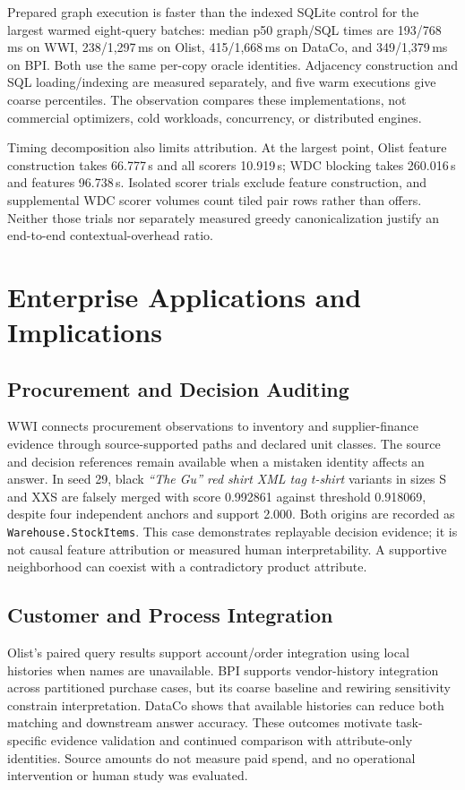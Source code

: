 \documentclass[conference,letterpaper]{IEEEtran}
\begin{document}
Prepared graph execution is faster than the indexed SQLite control for the largest warmed eight-query batches: median p50 graph/SQL times are 193/768\,ms on WWI, 238/1,297\,ms on Olist, 415/1,668\,ms on DataCo, and 349/1,379\,ms on BPI. Both use the same per-copy oracle identities. Adjacency construction and SQL loading/indexing are measured separately, and five warm executions give coarse percentiles. The observation compares these implementations, not commercial optimizers, cold workloads, concurrency, or distributed engines.

Timing decomposition also limits attribution. At the largest point, Olist feature construction takes 66.777\,s and all scorers 10.919\,s; WDC blocking takes 260.016\,s and features 96.738\,s. Isolated scorer trials exclude feature construction, and supplemental WDC scorer volumes count tiled pair rows rather than offers. Neither those trials nor separately measured greedy canonicalization justify an end-to-end contextual-overhead ratio.

\section{Enterprise Applications and Implications}
\label{sec:applications}
\subsection{Procurement and Decision Auditing}
WWI connects procurement observations to inventory and supplier-finance evidence through source-supported paths and declared unit classes. The source and decision references remain available when a mistaken identity affects an answer. In seed 29, black \emph{``The Gu'' red shirt XML tag t-shirt} variants in sizes S and XXS are falsely merged with score 0.992861 against threshold 0.918069, despite four independent anchors and support 2.000. Both origins are recorded as \texttt{Warehouse.StockItems}. This case demonstrates replayable decision evidence; it is not causal feature attribution or measured human interpretability. A supportive neighborhood can coexist with a contradictory product attribute.

\subsection{Customer and Process Integration}
Olist's paired query results support account/order integration using local histories when names are unavailable. BPI supports vendor-history integration across partitioned purchase cases, but its coarse baseline and rewiring sensitivity constrain interpretation. DataCo shows that available histories can reduce both matching and downstream answer accuracy. These outcomes motivate task-specific evidence validation and continued comparison with attribute-only identities. Source amounts do not measure paid spend, and no operational intervention or human study was evaluated.
\end{document}
